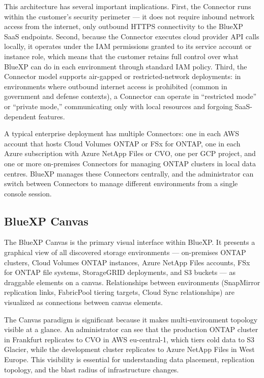 This architecture has several important implications. First, the Connector runs within the customer's security perimeter --- it does not require inbound network access from the internet, only outbound HTTPS connectivity to the BlueXP SaaS endpoints. Second, because the Connector executes cloud provider API calls locally, it operates under the IAM permissions granted to its service account or instance role, which means that the customer retains full control over what BlueXP can do in each environment through standard IAM policy. Third, the Connector model supports air-gapped or restricted-network deployments: in environments where outbound internet access is prohibited (common in government and defense contexts), a Connector can operate in ``restricted mode'' or ``private mode,'' communicating only with local resources and forgoing SaaS-dependent features.

A typical enterprise deployment has multiple Connectors: one in each AWS account that hosts Cloud Volumes ONTAP or FSx for ONTAP, one in each Azure subscription with Azure NetApp Files or CVO, one per GCP project, and one or more on-premises Connectors for managing ONTAP clusters in local data centres. BlueXP manages these Connectors centrally, and the administrator can switch between Connectors to manage different environments from a single console session.

\subsection{BlueXP Canvas}

The BlueXP Canvas is the primary visual interface within BlueXP. It presents a graphical view of all discovered storage environments --- on-premises ONTAP clusters, Cloud Volumes ONTAP instances, Azure NetApp Files accounts, FSx for ONTAP file systems, StorageGRID deployments, and S3 buckets --- as draggable elements on a canvas. Relationships between environments (SnapMirror replication links, FabricPool tiering targets, Cloud Sync relationships) are visualized as connections between canvas elements.

The Canvas paradigm is significant because it makes multi-environment topology visible at a glance. An administrator can see that the production ONTAP cluster in Frankfurt replicates to CVO in AWS eu-central-1, which tiers cold data to S3 Glacier, while the development cluster replicates to Azure NetApp Files in West Europe. This visibility is essential for understanding data placement, replication topology, and the blast radius of infrastructure changes.


